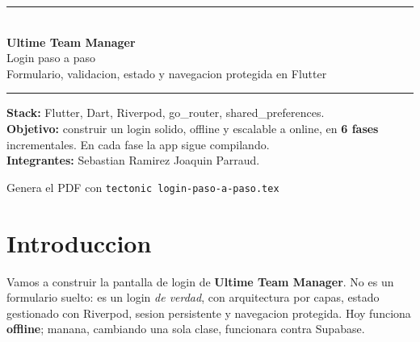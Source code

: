 \documentclass[11pt,a4paper,oneside]{book}
\begin{document}
\begin{titlepage}
\thispagestyle{empty}
\vspace*{2.5cm}
\begin{center}
{\color{brand}\rule{\textwidth}{2pt}}\\[10pt]
{\Huge\bfseries\color{brandDark} Ultime Team Manager}\\[10pt]
{\LARGE\color{accent} Login paso a paso}\\[6pt]
{\large Formulario, validacion, estado y navegacion protegida en Flutter}\\[10pt]
{\color{brand}\rule{\textwidth}{2pt}}
\end{center}

\vspace{2cm}
\begin{center}
\begin{minipage}{0.82\textwidth}
\large
\textbf{Stack:} Flutter, Dart, Riverpod, go\_router, shared\_preferences.\\[6pt]
\textbf{Objetivo:} construir un login solido, offline y escalable a online, en
\textbf{6 fases} incrementales. En cada fase la app sigue compilando.\\[6pt]
\textbf{Integrantes:} Sebastian Ramirez \; \textbullet\; Joaquin Parraud.
\end{minipage}
\end{center}

\vfill
\begin{center}\small\textcolor{midgray}%
{Genera el PDF con \texttt{tectonic login-paso-a-paso.tex}}\end{center}
\end{titlepage}

\tableofcontents
\cleardoublepage

\chapter*{Introduccion}

Vamos a construir la pantalla de login de \textbf{Ultime Team Manager}. No es un
formulario suelto: es un login \emph{de verdad}, con arquitectura por capas, estado
gestionado con Riverpod, sesion persistente y navegacion protegida. Hoy funciona
\textbf{offline}; manana, cambiando una sola clase, funcionara contra Supabase.
\end{document}
